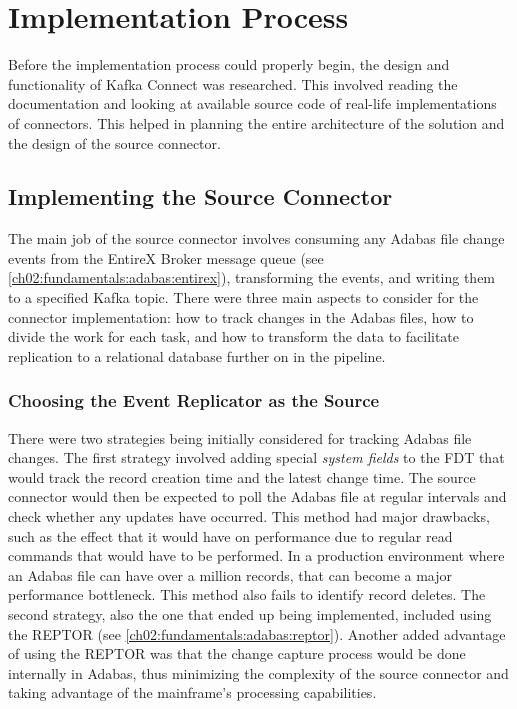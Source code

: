 \section{Implementation Process}
Before the implementation process could properly begin, the design and functionality of Kafka Connect was researched. This involved reading the documentation and looking at available source code of real-life implementations of connectors. This helped in planning the entire architecture of the solution and the design of the source connector.

\subsection{Implementing the Source Connector}
The main job of the source connector involves consuming any Adabas file change events from the EntireX Broker message queue (see \ref{ch02:fundamentals:adabas:entirex}), transforming the events, and writing them to a specified Kafka topic. There were three main aspects to consider for the connector implementation: how to track changes in the Adabas files, how to divide the work for each task, and how to transform the data to facilitate replication to a relational database further on in the pipeline.

\subsubsection{Choosing the Event Replicator as the Source}
There were two strategies being initially considered for tracking Adabas file changes. The first strategy involved adding special \textit{system fields} to the \ac{FDT} that would track the record creation time and the latest change time. The source connector would then be expected to poll the Adabas file at regular intervals and check whether any updates have occurred. This method had major drawbacks, such as the effect that it would have on performance due to regular read commands that would have to be performed. In a production environment where an Adabas file can have over a million records, that can become a major performance bottleneck. This method also fails to identify record deletes. The second strategy, also the one that ended up being implemented, included using the \ac{REPTOR} (see \ref{ch02:fundamentals:adabas:reptor}). Another added advantage of using the \ac{REPTOR} was that the change capture process would be done internally in Adabas, thus minimizing the complexity of the source connector and taking advantage of the mainframe's processing capabilities.

